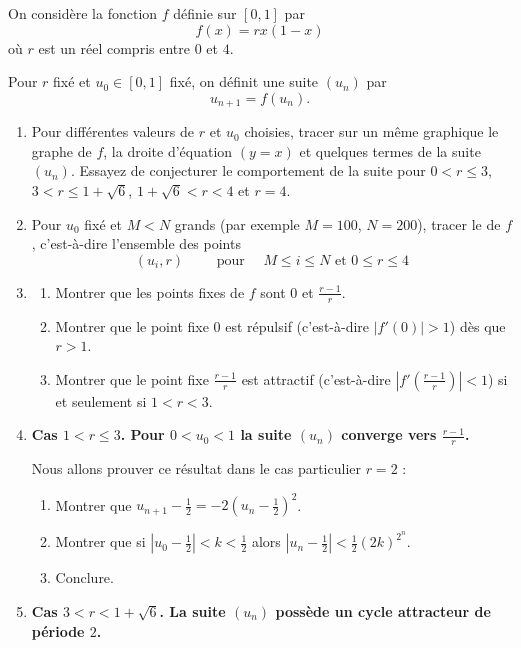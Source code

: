 \documentclass[class=report,crop=false]{standalone}
\begin{document}
\begin{tp}
On considère la fonction $f$ définie sur $[0,1]$ par 
$$f(x)=rx(1-x)$$
où $r$ est un réel compris entre $0$ et $4$.

Pour $r$ fixé et $u_0 \in [0,1]$ fixé, on définit une suite $(u_n)$ par
$$u_{n+1} = f(u_n).$$

\begin{enumerate}
  \item Pour différentes valeurs de $r$ et $u_0$ choisies, tracer sur un même graphique
  le graphe de $f$, la droite d'équation $(y=x)$ et quelques termes de la suite $(u_n)$. Essayez de conjecturer 
  le comportement de la suite pour $0<r\le3$, $3< r \le 1+\sqrt{6}$,
  $1+\sqrt{6}< r < 4$ et $r=4$. 
  
  \item Pour $u_0$ fixé et $M<N$ grands (par exemple $M=100$, $N=200$), tracer le  de $f$, c'est-à-dire l'ensemble des points
  $$(u_i,r) \qquad \text{ pour } \quad M \le i \le N \text{ et } 0 \le r \le 4$$
  
  \item 
  \begin{enumerate}
    \item Montrer que les points fixes de $f$ sont $0$ et $\frac{r-1}{r}$.
    \item Montrer que le point fixe $0$ est répulsif (c'est-à-dire $|f'(0)|>1$) dès que $r>1$.
    \item Montrer que le point fixe $\frac{r-1}{r}$ est attractif (c'est-à-dire $|f'(\frac{r-1}{r})|<1$)
    si et seulement si $1< r < 3$. 
  \end{enumerate}  
  
  
  \item \textbf{Cas $1 < r \le3$. Pour $0<u_0<1$ la suite $(u_n)$ converge vers $\frac{r-1}{r}$.}
 
  Nous allons prouver ce résultat dans le cas particulier $r=2$ :
  \begin{enumerate}
    \item Montrer que $u_{n+1}-\frac12 = -2\left(u_n-\frac12\right)^2$.
    \item Montrer que si $|u_0-\frac12| < k < \frac12$ alors 
    $|u_n-\frac12| < \frac12 (2k)^{2^n}$.
    \item Conclure.
  \end{enumerate} 
  
  \item \textbf{Cas $3<r<1+\sqrt{6}$. La suite $(u_n)$ possède un cycle attracteur de période $2$.}
   

\end{enumerate}
\end{tp}
\end{document}
